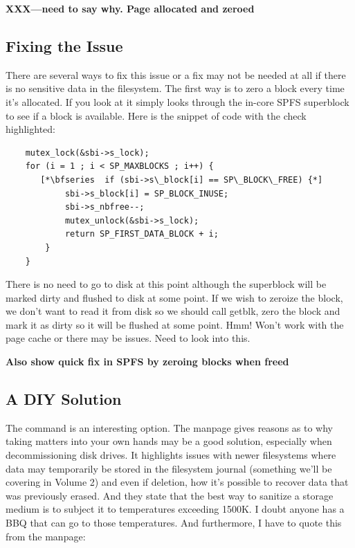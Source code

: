 \noindent
\textbf{XXX---need to say why. Page allocated and zeroed}

\subsection{Fixing the Issue}

There are several ways to fix this issue or a fix may not be needed at all if there is no sensitive data in the filesystem. The first way is to zero a block every time it's allocated. If you look at  it simply looks through the in-core SPFS superblock to see if a block is available. Here is the snippet of code with the check highlighted:

\begin{lstlisting}
    mutex_lock(&sbi->s_lock);
    for (i = 1 ; i < SP_MAXBLOCKS ; i++) {
       [*\bfseries  if (sbi->s\_block[i] == SP\_BLOCK\_FREE) {*]
            sbi->s_block[i] = SP_BLOCK_INUSE;
            sbi->s_nbfree--;
            mutex_unlock(&sbi->s_lock);
            return SP_FIRST_DATA_BLOCK + i;
        }
    }
\end{lstlisting}

\noindent
There is no need to go to disk at this point although the superblock will be marked dirty and flushed to disk at some point. If we wish to zeroize the block, we don't want to read it from disk so we should call getblk, zero the block and mark it as dirty so it will be flushed at some point. Hmm! Won't work with the page cache or there may be issues. Need to look into this.

{\bfseries Also show quick fix in SPFS by zeroing blocks when freed}

\subsection{A DIY Solution}

The  command is an interesting option. The manpage gives reasons as to why taking matters into your own hands may be a good solution, especially when decommissioning disk drives. It highlights issues with newer filesystems where data may temporarily be stored in the filesystem journal (something we'll be covering in Volume 2) and even if deletion, how it's possible to recover data that was previously erased. And they state that the best way to sanitize a storage medium is to subject it to temperatures exceeding 1500K. I doubt anyone has a BBQ that can go to those temperatures. And furthermore, I have to quote this from the manpage:

